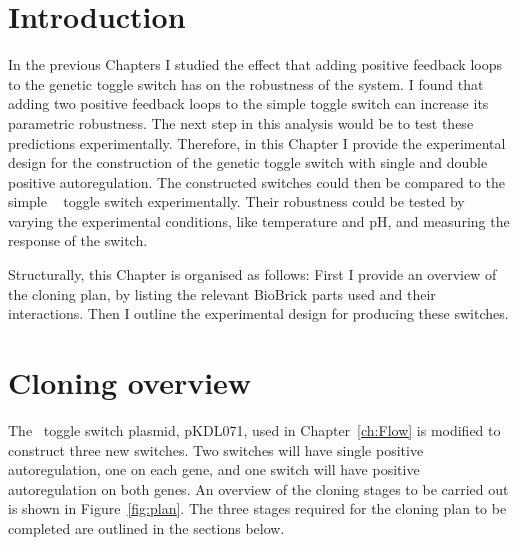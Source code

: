 
\section{Introduction}

In the previous Chapters I studied the effect that adding positive feedback loops to the genetic toggle switch has on the robustness of the system. I found that adding two positive feedback loops to the simple toggle switch can increase its parametric robustness. The next step in this analysis would be to test these predictions experimentally. Therefore, in this Chapter I provide the experimental design for the construction of the genetic toggle switch with single and double positive autoregulation. The constructed switches could then be compared to the simple ~\textcite{Litcofsky:2012gr} toggle switch experimentally. Their robustness could be tested by varying the experimental conditions, like temperature and pH, and measuring the response of the switch.

Structurally, this Chapter is organised as follows: First I provide an overview of the cloning plan, by listing the relevant BioBrick parts used and their interactions. Then I outline the experimental design for producing these switches.


\section{Cloning overview}

The~\textcite{Litcofsky:2012gr} toggle switch plasmid, pKDL071, used in Chapter~\ref{ch:Flow} is modified to construct three new switches. Two switches will have single positive autoregulation, one on each gene, and one switch will have positive autoregulation on both genes. An overview of the cloning stages to be carried out is shown in Figure~\ref{fig:plan}. The three stages required for the cloning plan to be completed are outlined in the sections below. 

